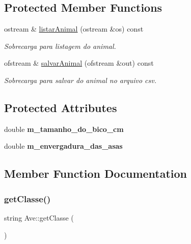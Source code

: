 \subsection*{Protected Member Functions}
\begin{DoxyCompactItemize}
\item 
\mbox{\label{class_ave_af9b3534d1679234164039dacfa13b3b3}} 
ostream \& \mbox{\hyperlink{class_ave_af9b3534d1679234164039dacfa13b3b3}{listar\+Animal}} (ostream \&os) const
\begin{DoxyCompactList}\small\item\em Sobrecarga para listagem do animal. \end{DoxyCompactList}\item 
\mbox{\label{class_ave_a525928d50113cf840f0cbef1151c2e50}} 
ofstream \& \mbox{\hyperlink{class_ave_a525928d50113cf840f0cbef1151c2e50}{salvar\+Animal}} (ofstream \&out) const
\begin{DoxyCompactList}\small\item\em Sobrecarga para salvar do animal no arquivo csv. \end{DoxyCompactList}\end{DoxyCompactItemize}
\subsection*{Protected Attributes}
\begin{DoxyCompactItemize}
\item 
\mbox{\label{class_ave_a6b226ae4077430877b040141105a9890}} 
double {\bfseries m\+\_\+tamanho\+\_\+do\+\_\+bico\+\_\+cm}
\item 
\mbox{\label{class_ave_a6261373aae903e524e220e53ded18693}} 
double {\bfseries m\+\_\+envergadura\+\_\+das\+\_\+asas}
\end{DoxyCompactItemize}


\subsection{Member Function Documentation}
\mbox{\label{class_ave_a635eb27ef1ef4c9928e133ce3448bfd0}} 
\subsubsection{\texorpdfstring{getClasse()}{getClasse()}}
{\footnotesize\ttfamily string Ave\+::get\+Classe (\begin{DoxyParamCaption}{ }\end{DoxyParamCaption})\hspace{0.3cm}{\ttfamily [virtual]}}



